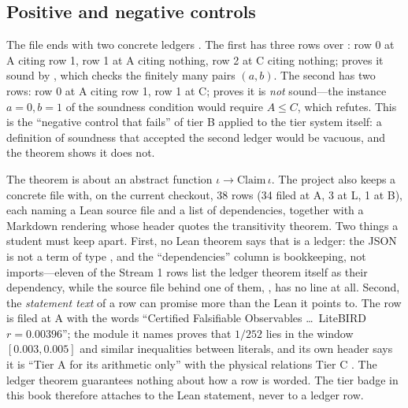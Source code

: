 \subsection{Positive and negative controls}

The file ends with two concrete ledgers . The first has
three rows over : row 0 at A citing row 1, row 1 at A citing nothing, row 2 at C
citing nothing;  proves it sound by , which checks
the finitely many pairs $(a,b)$. The second has two rows: row 0 at A citing row 1, row 1 at
C;  proves it is \emph{not} sound---the instance $a=0,b=1$
of the soundness condition would require $A\le C$, which  refutes. This is the
``negative control that fails'' of tier B applied to the tier system itself: a definition of
soundness that accepted the second ledger would be vacuous, and the theorem shows it does
not.

\begin{physicsbox}
The theorem is about an abstract function $\iota\to\text{Claim}\,\iota$. The project also
keeps a concrete file  with, on the current checkout, 38 rows (34 filed at
A, 3 at L, 1 at B), each naming a Lean source file and a list of dependencies, together with
a Markdown rendering  whose header quotes the transitivity theorem. Two
things a student must keep apart. First, no Lean theorem says that  is a
 ledger: the JSON is not a term of type , and the ``dependencies''
column is bookkeeping, not imports---eleven of the Stream 1 rows list the ledger theorem
 itself as their dependency, while the source file behind one of them,
, has no  line at all. Second, the \emph{statement
text} of a row can promise more than the Lean it points to. The row 
is filed at A with the words ``Certified Falsifiable Observables \ldots\ LiteBIRD $r =
0.00396$''; the module it names proves that $1/252$ lies in the window $[0.003,0.005]$ and
similar inequalities between literals, and its own header says it is ``Tier A for its
arithmetic only'' with the physical relations Tier C .
The ledger theorem guarantees nothing about how a row is worded. The tier badge in this
book therefore attaches to the Lean statement, never to a ledger row.
\end{physicsbox}

